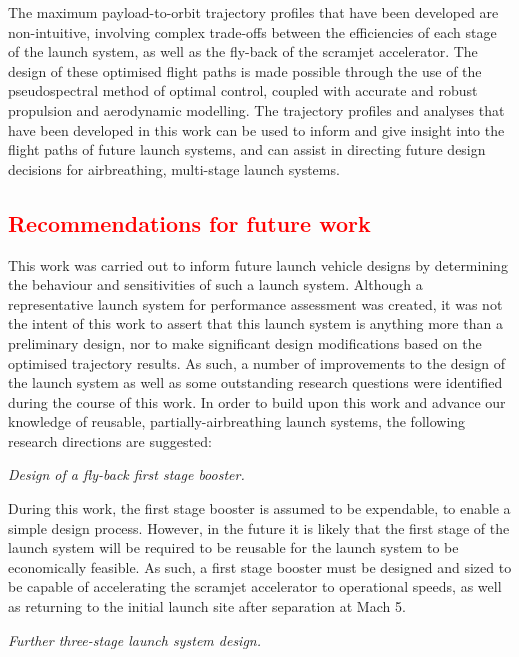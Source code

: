 The maximum payload-to-orbit trajectory profiles that have been developed are non-intuitive, involving complex trade-offs between the efficiencies of each stage of the launch system, as well as the fly-back of the scramjet accelerator. The design of these optimised flight paths is made possible through the use of the pseudospectral method of optimal control, coupled with accurate and robust propulsion and aerodynamic modelling.  
The trajectory profiles and analyses that have been developed in this work can be used to inform and give insight into the flight paths of future launch systems, and can assist in directing future design decisions for airbreathing, multi-stage launch systems. 

\textcolor{red}{
  \chapter{Recommendations for future work}
}
\noindent  	
 This work was carried out to inform future launch vehicle designs by determining the behaviour and sensitivities of such a launch system. 
  Although a representative launch system for performance assessment was created, it was not the intent of this work to assert that this launch system is anything more than a preliminary design, nor to make significant design modifications based on the optimised trajectory results.
 As such, a number of improvements to the design of the launch system as well as some outstanding research questions were identified during the course of this work.
 In order to build upon this work and advance our knowledge of reusable, partially-airbreathing launch systems, the following research directions are suggested:


\vspace{10pt}
 \textit{Design of a fly-back first stage booster.}
 
 \noindent
 During this work, the first stage booster is assumed to be expendable, to enable a simple design process. However, in the future it is likely that the first stage of the launch system will be required to be reusable for the launch system to be economically feasible. As such, a first stage booster must be designed and sized to be capable of accelerating the scramjet accelerator to operational speeds, as well as returning to the initial launch site after separation at Mach 5. 

\vspace{10pt}
	\textit{Further three-stage launch system design.}

